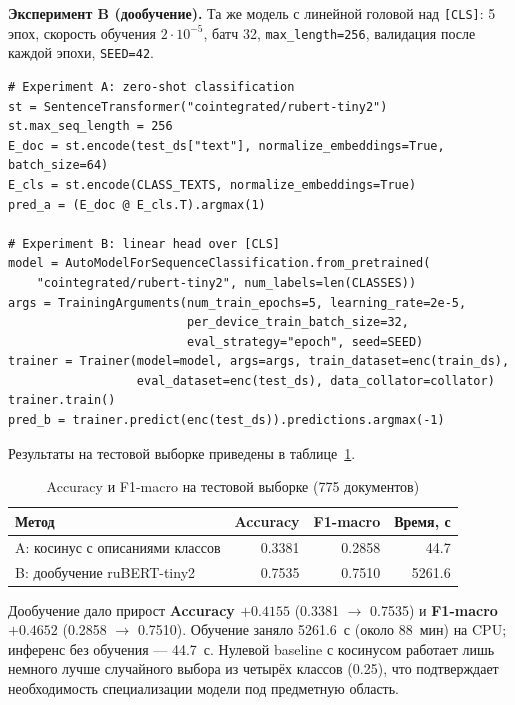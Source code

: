 \documentclass[14pt,a4paper]{extarticle}
\begin{document}
\textbf{Эксперимент B (дообучение).} Та же модель с линейной головой над
\texttt{[CLS]}: 5 эпох, скорость обучения $2\cdot10^{-5}$, батч 32,
\texttt{max\_length=256}, валидация после каждой эпохи, \texttt{SEED=42}.

\begin{lstlisting}
# Experiment A: zero-shot classification
st = SentenceTransformer("cointegrated/rubert-tiny2")
st.max_seq_length = 256
E_doc = st.encode(test_ds["text"], normalize_embeddings=True, batch_size=64)
E_cls = st.encode(CLASS_TEXTS, normalize_embeddings=True)
pred_a = (E_doc @ E_cls.T).argmax(1)

# Experiment B: linear head over [CLS]
model = AutoModelForSequenceClassification.from_pretrained(
    "cointegrated/rubert-tiny2", num_labels=len(CLASSES))
args = TrainingArguments(num_train_epochs=5, learning_rate=2e-5,
                         per_device_train_batch_size=32,
                         eval_strategy="epoch", seed=SEED)
trainer = Trainer(model=model, args=args, train_dataset=enc(train_ds),
                  eval_dataset=enc(test_ds), data_collator=collator)
trainer.train()
pred_b = trainer.predict(enc(test_ds)).predictions.argmax(-1)
\end{lstlisting}
\label{fig:clf-code}

Результаты на тестовой выборке приведены в таблице~\ref{tab:clf}.

\begin{table}[H]
    \centering
    \caption*{\raggedleft Accuracy и F1-macro на тестовой выборке (775 документов)}
    \label{tab:clf}
    \begin{tabular}{lrrr}
        \toprule
        Метод & Accuracy & F1-macro & Время, с \\
        \midrule
        A: косинус с описаниями классов & 0.3381 & 0.2858 & 44.7 \\
        B: дообучение ruBERT-tiny2     & 0.7535 & 0.7510 & 5261.6 \\
        \bottomrule
    \end{tabular}
\end{table}

Дообучение дало прирост \textbf{Accuracy $+0.4155$} (0.3381 $\to$ 0.7535) и
\textbf{F1-macro $+0.4652$} (0.2858 $\to$ 0.7510). Обучение заняло 5261.6~с
(около 88~мин) на CPU; инференс без обучения --- 44.7~с. Нулевой baseline
с косинусом работает лишь немного лучше случайного выбора из четырёх классов
(0.25), что подтверждает необходимость специализации модели под предметную область.
\end{document}
